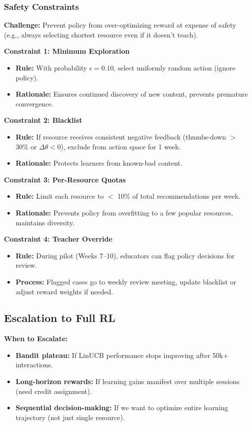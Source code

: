 \documentclass[11pt,letterpaper]{article}
\begin{document}
\subsubsection{Safety Constraints}

\textbf{Challenge:} Prevent policy from over-optimizing reward at expense of safety (e.g., always selecting shortest resource even if it doesn't teach).

\textbf{Constraint 1: Minimum Exploration}
\begin{itemize}
\item \textbf{Rule:} With probability $\epsilon = 0.10$, select uniformly random action (ignore policy).
\item \textbf{Rationale:} Ensures continued discovery of new content, prevents premature convergence.
\end{itemize}

\textbf{Constraint 2: Blacklist}
\begin{itemize}
\item \textbf{Rule:} If resource receives consistent negative feedback (thumbs-down $>$ 30\% or $\Delta\theta < 0$), exclude from action space for 1 week.
\item \textbf{Rationale:} Protects learners from known-bad content.
\end{itemize}

\textbf{Constraint 3: Per-Resource Quotas}
\begin{itemize}
\item \textbf{Rule:} Limit each resource to $<$ 10\% of total recommendations per week.
\item \textbf{Rationale:} Prevents policy from overfitting to a few popular resources, maintains diversity.
\end{itemize}

\textbf{Constraint 4: Teacher Override}
\begin{itemize}
\item \textbf{Rule:} During pilot (Weeks 7--10), educators can flag policy decisions for review.
\item \textbf{Process:} Flagged cases go to weekly review meeting, update blacklist or adjust reward weights if needed.
\end{itemize}

\subsection{Escalation to Full RL}

\textbf{When to Escalate:}
\begin{itemize}
\item \textbf{Bandit plateau:} If LinUCB performance stops improving after 50k+ interactions.
\item \textbf{Long-horizon rewards:} If learning gains manifest over multiple sessions (need credit assignment).
\item \textbf{Sequential decision-making:} If we want to optimize entire learning trajectory (not just single resource).
\end{itemize}
\end{document}
